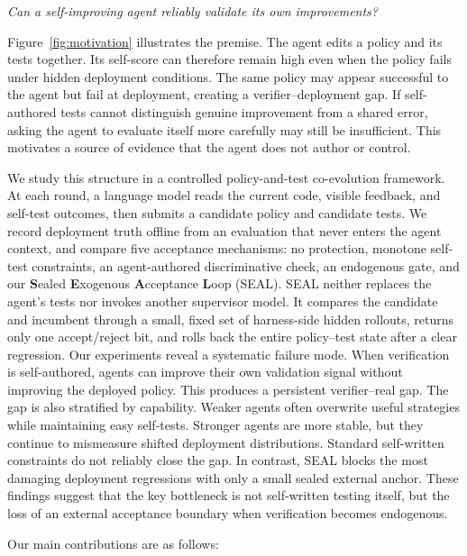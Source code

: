 \documentclass[letterpaper]{article} \usepackage{aaai2027}  \usepackage[hyphens]{url}  \usepackage{graphicx} \urlstyle{rm} \def\UrlFont{\rm}  \usepackage{natbib}  \usepackage{caption} \usepackage{amsfonts} \usepackage{multirow} \frenchspacing  \usepackage{algorithm}
\newcommand{\method}{SEAL}
\begin{document}
\begin{tcolorbox} 
\textit{Can a self-improving agent reliably validate its own improvements?}
\end{tcolorbox}



Figure~\ref{fig:motivation} illustrates the premise. The agent edits a policy and its tests together. Its self-score can therefore remain high even when the policy fails under hidden deployment conditions. 
The same policy may appear successful to the agent but fail at deployment, creating a verifier--deployment gap. 
If self-authored tests cannot distinguish genuine improvement from a shared error, asking the agent to evaluate itself more carefully may still be insufficient. This motivates a source of evidence that the agent does not author or control.


We study this structure in a controlled policy-and-test co-evolution framework. At each round, a language model reads the current code, visible feedback, and self-test outcomes, then submits a candidate policy and candidate tests. We record deployment truth offline from an evaluation that never enters the agent context, and compare five acceptance mechanisms: no protection, monotone self-test constraints, an agent-authored discriminative check, an endogenous gate, and our \textbf{S}ealed \textbf{E}xogenous \textbf{A}cceptance \textbf{L}oop (\method{}). \method{} neither replaces the agent's tests nor invokes another supervisor model. It compares the candidate and incumbent through a small, fixed set of harness-side hidden rollouts, returns only one accept/reject bit, and rolls back the entire policy--test state after a clear regression.
Our experiments reveal a systematic failure mode. When verification is self-authored, agents can improve their own validation signal without improving the deployed policy. 
This produces a persistent verifier–real gap. The gap is also stratified by capability. 
Weaker agents often overwrite useful strategies while maintaining easy self-tests. Stronger agents are more stable, but they continue to mismeasure shifted deployment distributions. 
Standard self-written constraints do not reliably close the gap. In contrast, SEAL blocks the most damaging deployment regressions with only a small sealed external anchor. These findings suggest that the key bottleneck is not self-written testing itself, but the loss of an external acceptance boundary when verification becomes endogenous.


Our main contributions are as follows:
\end{document}
